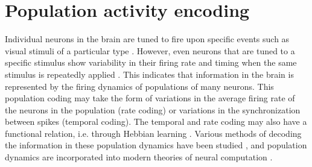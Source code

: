 
\chapter{Population activity encoding }

Individual neurons in the brain are tuned to fire upon specific events such as visual stimuli of a particular type \citep{Hubel1962} .
However, even neurons that are tuned to a specific stimulus show variability in their firing rate and timing when the same stimulus is repeatedly applied \citep{Georgopoulos1982}\citep{Newsome1989}.
This indicates that information in the brain is represented by the firing dynamics of populations of many neurons.
This population coding may take the form of variations in the average firing rate of the neurons in the population (rate coding) or variations in the synchronization between spikes (temporal coding).
The temporal and rate coding may also have a functional relation, i.e. through Hebbian learning \citep{Basawaraj2019}.
Various methods of decoding the information in these population dynamics have been studied \citep{Deneve1999}\citep{Xu2019}, 
and population dynamics are incorporated into modern theories of neural computation \citep{Pitkow2017}\citep{Nadeau2020}.

